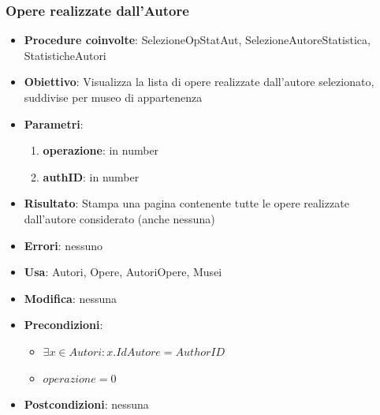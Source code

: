 \subsubsection{Opere realizzate dall’Autore}
\begin{itemize}
	\item \textbf{Procedure coinvolte}: SelezioneOpStatAut, SelezioneAutoreStatistica, StatisticheAutori
	\item \textbf{Obiettivo}: Visualizza la lista di opere realizzate dall'autore selezionato, suddivise per museo di appartenenza
	\item \textbf{Parametri}:
	\begin{enumerate}
		\item \textbf{operazione}: in number
		\item \textbf{authID}: in number
	\end{enumerate}
	\item \textbf{Risultato}: Stampa una pagina contenente tutte le opere realizzate dall'autore considerato (anche nessuna)
	\item \textbf{Errori}: nessuno
	\item \textbf{Usa}: Autori, Opere, AutoriOpere, Musei
	\item \textbf{Modifica}: nessuna
	\item \textbf{Precondizioni}:
	\begin{itemize}
		\item $\exists x \in Autori : x.IdAutore = AuthorID$
		\item $operazione  = 0$
	\end{itemize}
	\item \textbf{Postcondizioni}: nessuna
\end{itemize}

